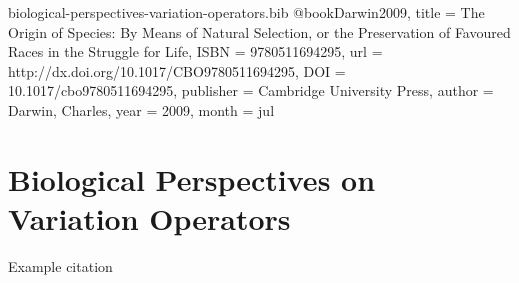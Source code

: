 \begin{bibunit}

\begin{filecontents*}[overwrite]{biological-perspectives-variation-operators.bib}
@book{Darwin2009,
  title = {The Origin of Species: By Means of Natural Selection,  or the Preservation of Favoured Races in the Struggle for Life},
  ISBN = {9780511694295},
  url = {http://dx.doi.org/10.1017/CBO9780511694295},
  DOI = {10.1017/cbo9780511694295},
  publisher = {Cambridge University Press},
  author = {Darwin,  Charles},
  year = {2009},
  month = jul 
}
\end{filecontents*} 

\section{Biological Perspectives on Variation Operators}
\label{sec:variation-operators}

Example citation \citep{Darwin2009}

    
\end{bibunit}
